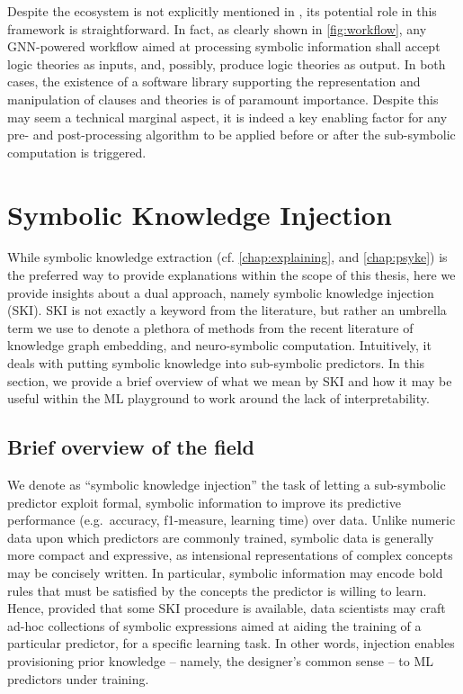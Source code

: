 \documentclass[12pt,a4paper,openright,twoside]{book}
\begin{document}
Despite the \twopkt{} ecosystem is not explicitly mentioned in \cite{gnn-woa2021}, its potential role in this framework is straightforward.
%
In fact, as clearly shown in \cref{fig:workflow}, any GNN-powered workflow aimed at processing symbolic information shall accept logic theories as inputs, and, possibly, produce logic theories as output.
%
In both cases, the existence of a software library supporting the representation and manipulation of clauses and theories is of paramount importance.
%
Despite this may seem a technical marginal aspect, it is indeed a key enabling factor for any pre- and post-processing algorithm to be applied before or after the sub-symbolic computation is triggered.

\section{Symbolic Knowledge Injection}
\label{sec:ski}


While symbolic knowledge extraction (cf. \cref{chap:explaining}, and \cref{chap:psyke}) is the preferred way to provide explanations within the scope of this thesis, here we provide insights about a dual approach, namely symbolic knowledge injection (SKI).
%
SKI is not exactly a keyword from the literature, but rather an umbrella term we use to denote a plethora of methods from the recent literature of knowledge graph embedding, and neuro-symbolic computation.
%
Intuitively, it deals with putting symbolic knowledge into sub-symbolic predictors.
%
In this section, we provide a brief overview of what we mean by SKI and how it may be useful within the ML playground to work around the lack of interpretability.

\subsection{Brief overview of the field}

We denote as ``symbolic knowledge injection'' the task of letting a sub-symbolic predictor exploit formal, symbolic information to improve its predictive performance (e.g.\ accuracy, f1-measure, learning time) over data.
%
Unlike numeric data upon which predictors are commonly trained, symbolic data is generally more compact and expressive, as intensional representations of complex concepts may be concisely written.
%
In particular, symbolic information may encode bold rules that must be satisfied by the concepts the predictor is willing to learn.
%
Hence, provided that some SKI procedure is available, data scientists may craft ad-hoc collections of symbolic expressions aimed at aiding the training of a particular predictor, for a specific learning task.
%
In other words, injection enables provisioning prior knowledge -- namely, the designer's common sense --  to ML predictors under training.
\end{document}
